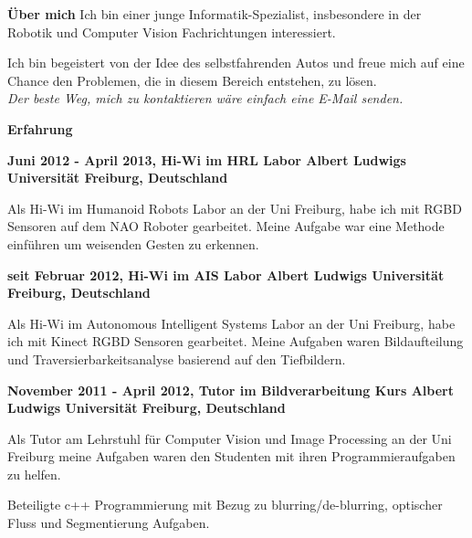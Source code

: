 \documentclass[a4paper,12pt,final]{memoir}
\newcommand{\Sep}{\vspace{1.5em}}
\newcommand{\SmallSep}{\vspace{0.5em}}
\newenvironment{AboutMe}
	{\ignorespaces\textbf{\color{Black} \"{U}ber mich}}
	{\Sep\ignorespacesafterend}
\newcommand{\CVSection}[1]
	{\Large\textbf{#1}\par
	\SmallSep\normalsize\normalfont}
\newcommand{\CVItem}[1]
	{\textbf{\color{MidnightBlue} #1}}
\begin{document}
\normalsize\normalfont

\begin{AboutMe}
\newline 
Ich bin einer junge Informatik-Spezialist, insbesondere in der Robotik und Computer Vision Fachrichtungen interessiert.

Ich bin begeistert von der Idee des selbstfahrenden Autos und freue mich auf eine Chance den Problemen, die in diesem Bereich entstehen, zu l\"{o}sen. \\
\emph {Der beste Weg, mich zu kontaktieren w\"{a}re einfach eine E-Mail senden.}
\end{AboutMe}

\CVSection{Erfahrung}
\CVItem{Juni 2012 - April 2013, Hi-Wi im HRL Labor
\newline Albert Ludwigs Universit\"{a}t Freiburg, Deutschland}
\begin{compactitem}[\color{RoyalBlue}$\circ$]
	\item Als Hi-Wi im Humanoid Robots Labor an der Uni Freiburg, habe ich mit RGBD Sensoren auf dem NAO Roboter gearbeitet. Meine Aufgabe war eine Methode einf\"{u}hren um weisenden Gesten zu erkennen. 
\end{compactitem}
\SmallSep

\CVItem{seit Februar 2012, Hi-Wi im AIS Labor
\newline Albert Ludwigs Universit\"{a}t Freiburg, Deutschland}
\begin{compactitem}[\color{RoyalBlue}$\circ$]
\item Als Hi-Wi im Autonomous Intelligent Systems Labor an der Uni Freiburg, habe ich mit Kinect RGBD Sensoren gearbeitet. Meine Aufgaben waren Bildaufteilung und Traversierbarkeitsanalyse basierend auf den Tiefbildern. 
\end{compactitem}
\SmallSep

\CVItem{November 2011 - April 2012, Tutor im \newline Bildverarbeitung Kurs
\newline Albert Ludwigs Universit\"{a}t Freiburg, Deutschland}
\begin{compactitem}[\color{RoyalBlue}$\circ$]
\item Als Tutor am Lehrstuhl f\"{u}r Computer Vision und Image Processing an der Uni Freiburg meine Aufgaben waren den Studenten mit ihren Programmieraufgaben zu helfen. 
\item Beteiligte c++ Programmierung mit Bezug zu blurring/de-blurring, optischer Fluss und Segmentierung Aufgaben.
\end{compactitem}
\SmallSep
\end{document}
